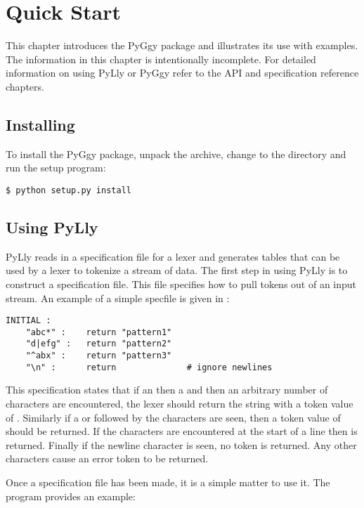 \chapter{Quick Start}

This chapter introduces the PyGgy package and illustrates its use
with examples.  The information in this chapter is intentionally
incomplete.  For detailed information on using PyLly or PyGgy refer
to the API and specification reference chapters.

\section{Installing}
To install the PyGgy package, unpack the archive, change to the
 directory and run the setup program:

\begin{verbatim}
$ python setup.py install
\end{verbatim}


\section{Using PyLly}
PyLly reads in a specification file for a lexer and generates tables
that can be used by a lexer to tokenize a stream of data.  The first
step in using PyLly is to construct a specification file.  This
file specifies how to pull tokens out of an input stream.  
An example of a simple specfile is given in :

\begin{verbatim}
INITIAL :
    "abc*" :    return "pattern1"
    "d|efg" :   return "pattern2"
    "^abx" :    return "pattern3"
    "\n" :      return              # ignore newlines
\end{verbatim}

This specification states that if an  then a  and then an
arbitrary number of  characters are encountered, the lexer should
return the string with a token value of .  
Similarly if a  or  followed
by the characters  are seen, then a token value of  
should be returned.
If the characters  are encountered at the start of a line then
 is returned.  Finally if the newline character is seen,
no token is returned.  Any other characters cause an error token
to be returned.

Once a specification file has been made, it is a simple matter to
use it.  The  program provides an example:

